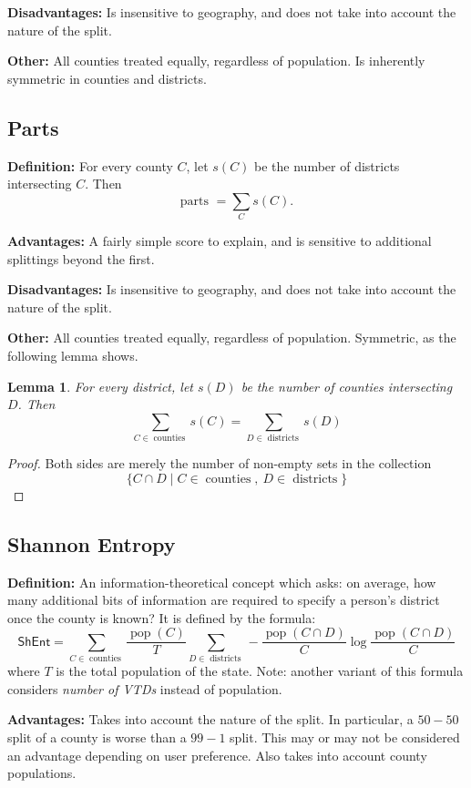 \documentclass{mgggarticle}
\newtheorem{Lemma}{Lemma}
\DeclareMathOperator{\pop}{pop}
\DeclareMathOperator{\dis}{districts}
\DeclareMathOperator{\cou}{counties}
\begin{document}
\textbf{Disadvantages:} Is insensitive to geography, and does not take into account the nature of the split.

\textbf{Other: } All counties treated equally, regardless of population. Is inherently symmetric in counties and districts.


\subsection{Parts}
\textbf{Definition: } For every county $C$, let $s(C)$ be the number of districts intersecting $C$. Then
$$
\text{parts } = \sum_{C} s(C).
$$ 

\textbf{Advantages:} A fairly simple score to explain, and is sensitive to additional splittings beyond the first. 

\textbf{Disadvantages:} Is insensitive to geography, and does not take into account the nature of the split.

\textbf{Other: } All counties treated equally, regardless of population. Symmetric, as the following lemma shows.

\begin{Lemma}
For every district, let $s(D)$ be the number of counties intersecting $D$. Then
$$
\sum_{C \in \cou} s(C) = \sum_{D \in \dis} s(D)
$$
\end{Lemma}
\begin{proof}
Both sides are merely the number of non-empty sets in the collection
$$
\{ C \cap D \mid C \in \cou,\ D \in \dis \}
$$
\end{proof}

\subsection{Shannon Entropy}
\textbf{Definition: } An information-theoretical concept which asks: on average, how many additional bits of information are required to specify a person's district once the county is known? It is defined by the formula: 
$$
\textsf{ShEnt} = \sum_{C \in \cou} \frac{\pop(C)}{T} \sum_{D \in \dis} - \frac{\pop(C \cap D)}{C} \log \frac{\pop(C \cap D)}{C}
$$
where $T$ is the total population of the state. Note: another variant of this formula considers \emph{number of VTDs} instead of population. 

\textbf{Advantages: } Takes into account the nature of the split. In particular, a $50-50$ split of a county is worse than a $99-1$ split. This may or may not be considered an advantage depending on user preference. Also takes into account county populations.
\end{document}
